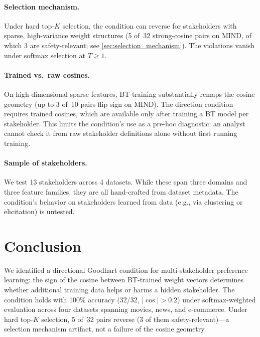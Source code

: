 \documentclass[11pt,letterpaper]{article}
\begin{document}
\paragraph{Selection mechanism.}
Under hard top-$K$ selection, the condition can reverse for
stakeholders with sparse, high-variance weight structures (5 of~32
strong-cosine pairs on MIND, of which 3 are safety-relevant; see
\cref{sec:selection_mechanism}). The
violations vanish under softmax selection at $T \geq 1$.

\paragraph{Trained vs.\ raw cosines.}
On high-dimensional sparse features, BT training substantially
remaps the cosine geometry (up to 3 of~10 pairs flip sign on MIND).
The direction condition requires trained cosines, which are available
only after training a BT model per stakeholder. This limits the
condition's use as a pre-hoc diagnostic: an analyst cannot check it
from raw stakeholder definitions alone without first running training.

\paragraph{Sample of stakeholders.}
We test 13 stakeholders across 4 datasets. While these span three
domains and three feature families, they are all hand-crafted from
dataset metadata. The condition's behavior on stakeholders learned
from data (e.g., via clustering or elicitation) is untested.

\section{Conclusion}
\label{sec:conclusion}

We identified a directional Goodhart condition for multi-stakeholder
preference learning: the sign of the cosine between BT-trained weight
vectors determines whether additional training data helps or harms a
hidden stakeholder. The condition holds with 100\% accuracy (32/32,
$|\cos| > 0.2$) under softmax-weighted evaluation across four
datasets spanning movies, news, and e-commerce. Under hard top-$K$
selection, 5 of~32 pairs reverse (3 of them safety-relevant)---a
selection mechanism artifact, not a failure of the cosine geometry.
\end{document}

